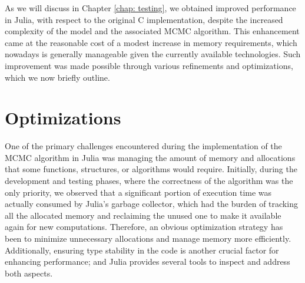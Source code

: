 \documentclass[12pt,	%
	a4paper,		%
	twoside,		%
	openright,		%
	titlepage,%
	]{book}
\theoremstyle{definition}
\begin{document}

As we will discuss in Chapter \ref{chap: testing}, we obtained improved performance in Julia, with respect to the original C implementation, despite the increased complexity of the model and the associated MCMC algorithm. This enhancement came at the reasonable cost of a modest increase in memory requirements, which nowadays is generally manageable given the currently available technologies. Such improvement was made possible through various refinements and optimizations, which we now briefly outline. \nowidow

\section{Optimizations}
One of the primary challenges encountered during the implementation of the MCMC algorithm in Julia was managing the amount of memory and allocations that some functions, structures, or algorithms would require. Initially, during the development and testing phases, where the correctness of the algorithm was the only priority, we observed that a significant portion of execution time was actually consumed by Julia's garbage collector, which had the burden of tracking all the allocated memory and reclaiming the unused one to make it available again for new computations. Therefore, an obvious optimization strategy has been to minimize unnecessary allocations and manage memory more efficiently. Additionally, ensuring type stability in the code is another crucial factor for enhancing performance; and Julia provides several tools to inspect and address both aspects.
\end{document}
